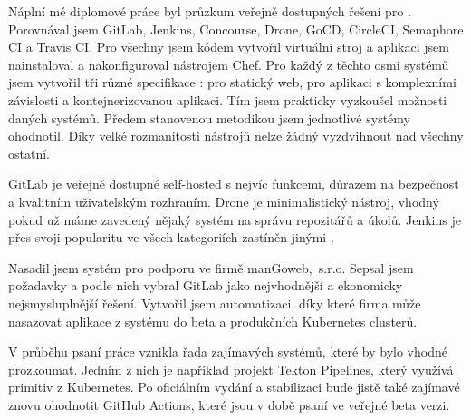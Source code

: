 \label{Závěr}
    Náplní mé diplomové práce byl průzkum veřejně dostupných řešení pro \CICD. Porovnával jsem GitLab, Jenkins, Concourse, Drone, GoCD, CircleCI, Semaphore CI a Travis CI. Pro všechny jsem kódem vytvořil virtuální stroj a aplikaci jsem nainstaloval a nakonfiguroval nástrojem Chef. Pro každý z těchto osmi systémů jsem vytvořil tři různé specifikace \CI: pro statický web, pro aplikaci s komplexními závislosti a kontejnerizovanou aplikaci. Tím jsem prakticky vyzkoušel možnosti daných systémů. Předem stanovenou metodikou jsem jednotlivé systémy ohodnotil. Díky velké rozmanitosti nástrojů nelze žádný vyzdvihnout nad všechny ostatní.

    GitLab je veřejně dostupné self-hosted \CI s nejvíc funkcemi, důrazem na bezpečnost a kvalitním uživatelským rozhraním. Drone je minimalistický nástroj, vhodný pokud už máme zavedený nějaký systém na správu repozitářů a úkolů. Jenkins je přes svoji popularitu ve všech kategoriích zastíněn jinými \CICD.

    Nasadil jsem systém pro podporu \CICD ve firmě manGoweb,~s.r.o. Sepsal jsem požadavky a podle nich vybral GitLab jako nejvhodnější a ekonomicky nejsmysluplnější řešení. Vytvořil jsem automatizaci, díky které firma může nasazovat aplikace z \CI systému do beta a produkčních Kubernetes clusterů.

    V průběhu psaní práce vznikla řada zajímavých \CICD systémů, které by bylo vhodné prozkoumat. Jedním z nich je například projekt Tekton Pipelines, který využívá primitiv z Kubernetes. Po oficiálním vydání a stabilizaci bude jistě také zajímavé znovu ohodnotit GitHub Actions, které jsou v době psaní ve veřejné beta verzi.

